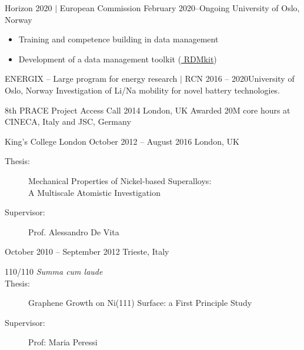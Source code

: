 \documentclass[10pt,a4paper,ragged2e,withhyper]{altacv}
\begin{document}
\begin{paracol}{2}
\medskip

        {Horizon 2020 $\vert$ European Commission}
        {February 2020--Ongoing}
        {University of Oslo, Norway}
        \small{ 
          \begin{itemize}
          \item Training and competence building in data management 
          \item Development of a data management toolkit (\href{https://rdmkit.elixir-europe.org/}{\color{blue} RDMkit})
          \end{itemize}
        }

\divider


        {ENERGIX -- Large program for energy research $\vert$ RCN}
        {2016 -- 2020}{University of Oslo, Norway}
        \small{
          Investigation of Li/Na mobility for novel battery technologies. 
        }

\medskip
{}
        {8th PRACE Project Access Call}
        {2014}
        {London, UK}
        \small{
          Awarded 20M core hours at CINECA, Italy and JSC, Germany
        }

        
\newpage


      {King's College London}
      {October 2012 -- August 2016}
      {London, UK}
      \small{
        \begin{description}
        \item[Thesis:]
          Mechanical Properties of Nickel-based Superalloys:\\ A Multiscale Atomistic Investigation
        \item[Supervisor:]
          Prof. Alessandro De Vita
        \end{description}  
      }

\medskip

        {October 2010 -- September 2012}
        {Trieste, Italy}
        \small{
          \begin{description}
          \item[110/110 \textit{Summa cum laude}]
          \item[Thesis:]
            Graphene Growth on Ni(111) Surface: a First Principle Study 
          \item[Supervisor:]
            Prof: Maria Peressi
          \end{description}
        }


\end{paracol}
\end{document}
